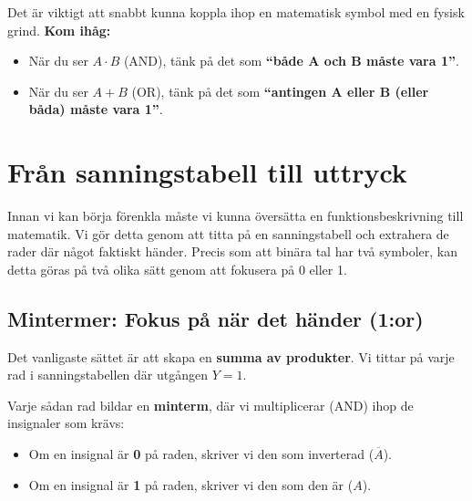 \documentclass[
  swedish,
  letterpaper,
  oneside,
  openany]{book}
\providecommand{\tightlist}{%
  \setlength{\itemsep}{0pt}\setlength{\parskip}{0pt}}
\begin{document}
\begin{tcolorbox}[enhanced jigsaw, arc=.35mm, bottomrule=.15mm, bottomtitle=1mm, breakable, colback=white, colbacktitle=quarto-callout-tip-color!10!white, colframe=quarto-callout-tip-color-frame, coltitle=black, left=2mm, leftrule=.75mm, opacityback=0, opacitybacktitle=0.6, rightrule=.15mm, title=\textcolor{quarto-callout-tip-color}{\faLightbulb}\hspace{0.5em}{Visuell översikt}, titlerule=0mm, toprule=.15mm, toptitle=1mm]

Det är viktigt att snabbt kunna koppla ihop en matematisk symbol med en
fysisk grind. \textbf{Kom ihåg:}

\begin{itemize}
\tightlist
\item
  När du ser \(A \cdot B\) (AND), tänk på det som \textbf{``både A och B
  måste vara 1''}.
\item
  När du ser \(A + B\) (OR), tänk på det som \textbf{``antingen A eller
  B (eller båda) måste vara 1''}.
\end{itemize}

\end{tcolorbox}

\section{Från sanningstabell till
uttryck}\label{fruxe5n-sanningstabell-till-uttryck}

Innan vi kan börja förenkla måste vi kunna översätta en
funktionsbeskrivning till matematik. Vi gör detta genom att titta på en
sanningstabell och extrahera de rader där något faktiskt händer. Precis
som att binära tal har två symboler, kan detta göras på två olika sätt
genom att fokusera på 0 eller 1.

\subsection{Mintermer: Fokus på när det händer
(1:or)}\label{sec-mintermer}

Det vanligaste sättet är att skapa en \textbf{summa av produkter}. Vi
tittar på varje rad i sanningstabellen där utgången \(Y = 1\).

Varje sådan rad bildar en \textbf{minterm}, där vi multiplicerar (AND)
ihop de insignaler som krävs:

\begin{itemize}
\tightlist
\item
  Om en insignal är \textbf{0} på raden, skriver vi den som inverterad
  (\(\overline{A}\)).
\item
  Om en insignal är \textbf{1} på raden, skriver vi den som den är
  (\(A\)).
\end{itemize}
\end{document}
